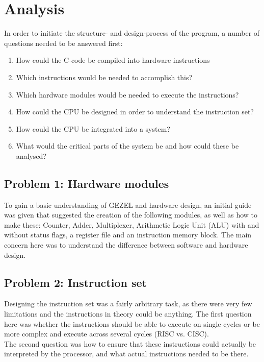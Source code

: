 \documentclass[12pt,a4paper]{article}
\begin{document}
\section{Analysis}
 	In order to initiate the structure- and design-process of the program, a number of questions needed to be answered first:\\
 	
 	\begin{enumerate}
	\item How could the C-code be compiled into hardware instructions
	\item Which instructions would be needed to accomplish this?
	\item Which hardware modules would be needed to execute the instructions?	
	\item How could the CPU be designed in order to understand the instruction set?
	\item How could the CPU be integrated into a system?
	\item What would the critical parts of the system be and how could these be analysed?
\end{enumerate}

\subsection{Problem 1: Hardware modules}
	To gain a basic understanding of GEZEL and hardware design, an initial guide was given that suggested the creation of the following modules, as well as how to make these: Counter, Adder, Multiplexer, Arithmetic Logic Unit (ALU) with and without status flags, a register file and an instruction memory block. The main concern here was to understand the difference between software and hardware design.\\
	
\subsection{Problem 2: Instruction set}
	Designing the instruction set was a fairly arbitrary task, as there were very few limitations and the instructions in theory could be anything. The first question here was whether the instructions should be able to execute on single cycles or be more complex and execute across several cycles (RISC vs. CISC).\\
	The second question was how to ensure that these instructions could actually be interpreted by the processor, and what actual instructions needed to be there.\\
	\\
	
\end{document}
